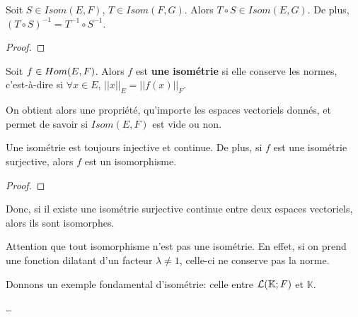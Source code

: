 \begin{proposition}
	Soit $S \in Isom(E, F)$, $T \in Isom(F, G)$.
	Alors $T \circ S \in Isom(E, G)$. De plus, $(T \circ S)^{-1} = T^{-1} \circ
	S^{-1}$.
\end{proposition}

\ifdefined\outputproof
\begin{proof}

\end{proof}
\fi

\begin{definition}
\label{definition_isometrie}
	Soit $f \in Hom(E, F)$.
	Alors $f$ est \textbf{une isométrie} si elle conserve les normes, c'est-à-dire si
	$\forall x \in E$, $||x||_{E} =  ||f(x)||_{F}$.
\end{definition}

On obtient alors une propriété, qu'importe les espaces vectoriels donnés, et
permet de savoir si $Isom(E, F)$ est vide ou non.

\begin{proposition}
	Une isométrie est toujours injective et continue. De plus, si $f$ est une
	isométrie surjective, alors $f$ est un isomorphisme.
\end{proposition}

\ifdefined\outputproof
\begin{proof}

\end{proof}
\fi

Donc, si il existe une isométrie surjective continue entre deux espaces
vectoriels, alors ils sont isomorphes.

Attention que tout isomorphisme n'est pas une isométrie. En effet, si on prend
une fonction dilatant d'un facteur $\lambda \neq 1$, celle-ci ne conserve pas la
norme.

Donnons un exemple fondamental d'isométrie: celle entre
$\mathcal{L}(\mathbb{K}; F)$ et $\mathbb{K}$.

\ldots
